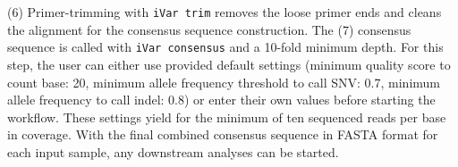 (6) Primer-trimming with \texttt{iVar trim} removes the loose primer ends and cleans the alignment for the consensus sequence construction. The (7) consensus sequence is called with \texttt{iVar consensus} and a 10-fold minimum depth. For this step, the user can either use provided default settings (minimum quality score to count base: 20, minimum allele frequency threshold to call SNV: 0.7, minimum allele frequency to call indel: 0.8) or enter their own values before starting the workflow. These settings yield for the minimum of ten sequenced reads per base in coverage. With the final combined consensus sequence in FASTA format for each input sample, any downstream analyses can be started. \\

